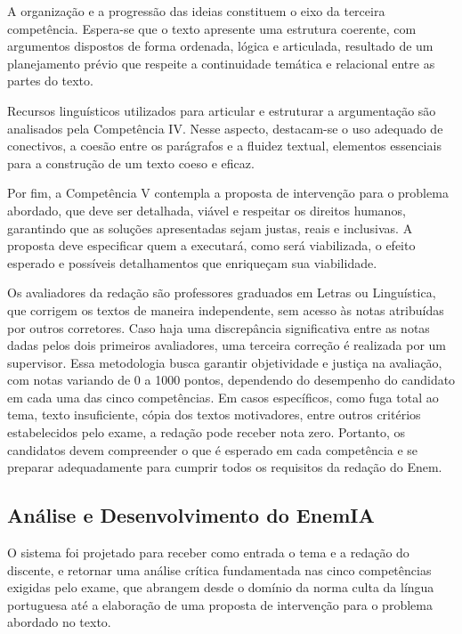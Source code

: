 \documentclass[portuguese]{textolivre}
\begin{document}
A organização e a progressão das ideias constituem o eixo da terceira competência. Espera-se que o texto apresente uma estrutura coerente, com argumentos dispostos de forma ordenada, lógica e articulada, resultado de um planejamento prévio que respeite a continuidade temática e relacional entre as partes do texto.

Recursos linguísticos utilizados para articular e estruturar a argumentação são analisados pela Competência IV. Nesse aspecto, destacam-se o uso adequado de conectivos, a coesão entre os parágrafos e a fluidez textual, elementos essenciais para a construção de um texto coeso e eficaz. 

Por fim, a Competência V contempla a proposta de intervenção para o problema abordado, que deve ser detalhada, viável e respeitar os direitos humanos, garantindo que as soluções apresentadas sejam justas, reais e inclusivas. A proposta deve especificar quem a executará, como será viabilizada, o efeito esperado e possíveis detalhamentos que enriqueçam sua viabilidade.

Os avaliadores da redação são professores graduados em Letras ou Linguística, que corrigem os textos de maneira independente, sem acesso às notas atribuídas por outros corretores. Caso haja uma discrepância significativa entre as notas dadas pelos dois primeiros avaliadores, uma terceira correção é realizada por um supervisor. Essa metodologia busca garantir objetividade e justiça na avaliação, com notas variando de 0 a 1000 pontos, dependendo do desempenho do candidato em cada uma das cinco competências. Em casos específicos, como fuga total ao tema, texto insuficiente, cópia dos textos motivadores, entre outros critérios estabelecidos pelo exame, a redação pode receber nota zero. Portanto, os candidatos devem compreender o que é esperado em cada competência e se preparar adequadamente para cumprir todos os requisitos da redação do Enem.

\subsection{\textbf{Análise e Desenvolvimento do EnemIA}}

O sistema foi projetado para receber como entrada o tema e a redação do discente, e retornar uma análise crítica fundamentada nas cinco competências exigidas pelo exame, que abrangem desde o domínio da norma culta da língua portuguesa até a elaboração de uma proposta de intervenção para o problema abordado no texto.
\end{document}
